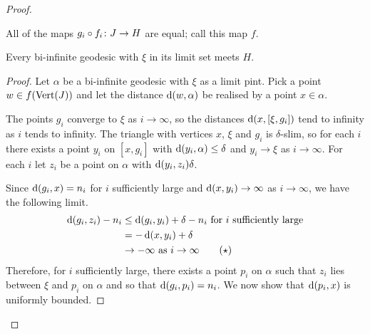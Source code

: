 \documentclass[a4paper]{article}
\begin{document}
\begin{proof}
\begin{definition}
  All of the maps $g_i \circ f_i \colon J \to H$ are equal; call this map
  $f$. 
\end{definition}

\begin{lemma}\label{lem:geodesicsmeethorosphere}
  Every bi-infinite geodesic with $\xi$ in its limit set meets $H$.
\end{lemma}

\begin{proof}
  Let $\alpha$ be a bi-infinite geodesic with $\xi$ as a limit pint. Pick a
  point $w \in f(\operatorname{Vert}(J))$ and let the distance $\operatorname{d}(w,\alpha)$ be
  realised by a point $x \in \alpha$.

  The points $g_i$ converge to $\xi$ as $i\to\infty$, so the distances
  $\operatorname{d}(x, [\xi, g_i])$ tend to infinity as $i$ tends to infinity. The
  triangle with vertices $x$, $\xi$ and $g_i$ is $\delta$-slim, so for each $i$
  there exists a point $y_i$ on $[x, g_i]$ with $\operatorname{d}(y_i, \alpha) \leq
  \delta$ and $y_i\to\xi$ as $i\to\infty$.  For each $i$ let $z_i$ be a point
  on $\alpha$ with $\operatorname{d}(y_i, z_i) \delta$.

  Since $\operatorname{d}(g_i, x) = n_i$ for $i$ sufficiently large and $\operatorname{d}(x,y_i) \to
  \infty$ as $i\to\infty$, we have the following limit.
  \begin{align*}\label{eqn:zi_closer_to_gi_than_x}
    \operatorname{d}(g_i,z_i) - n_i &\leq \operatorname{d}(g_i,y_i) + \delta - n_i \text{ for $i$
                                        sufficiently large} \\
                         &= - \operatorname{d}(x,y_i) + \delta \\
                         &\to -\infty\text{ as $i \to \infty$} \tag{$\star$}
  \end{align*}
  Therefore, for $i$ sufficiently large, there exists a point $p_i$ on $\alpha$
  such that $z_i$ lies between $\xi$ and $p_i$ on $\alpha$ and so that
  $\operatorname{d}(g_i,p_i)=n_i$. We now show that $\operatorname{d}(p_i, x)$ is uniformly bounded.


\end{proof}
\end{proof}
\end{document}
